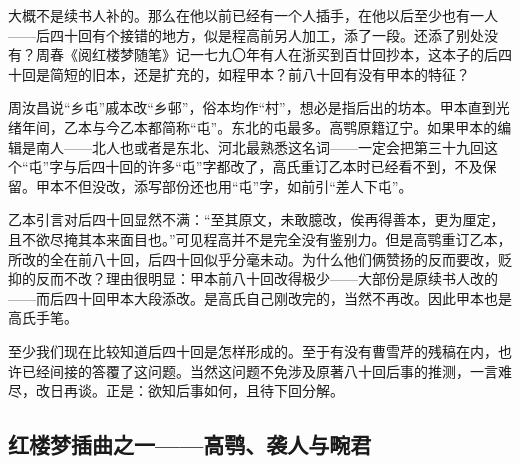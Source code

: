 \par 大概不是续书人补的。那么在他以前已经有一个人插手，在他以后至少也有一人——后四十回有个接错的地方，似是程高前另人加工，添了一段。还添了别处没有？周春《阅红楼梦随笔》记一七九〇年有人在浙买到百廿回抄本，这本子的后四十回是简短的旧本，还是扩充的，如程甲本？前八十回有没有甲本的特征？
\par 周汝昌说“乡屯”戚本改“乡邨”，俗本均作“村”，想必是指后出的坊本。甲本直到光绪年间，乙本与今乙本都简称“屯”。东北的屯最多。高鹗原籍辽宁。如果甲本的编辑是南人——北人也或者是东北、河北最熟悉这名词——一定会把第三十九回这个“屯”字与后四十回的许多“屯”字都改了，高氏重订乙本时已经看不到，不及保留。甲本不但没改，添写部份还也用“屯”字，如前引“差人下屯”。
\par 乙本引言对后四十回显然不满：“至其原文，未敢臆改，俟再得善本，更为厘定，且不欲尽掩其本来面目也。”可见程高并不是完全没有鉴别力。但是高鹗重订乙本，所改的全在前八十回，后四十回似乎分毫未动。为什么他们俩赞扬的反而要改，贬抑的反而不改？理由很明显：甲本前八十回改得极少——大部份是原续书人改的——而后四十回甲本大段添改。是高氏自己刚改完的，当然不再改。因此甲本也是高氏手笔。
\par 至少我们现在比较知道后四十回是怎样形成的。至于有没有曹雪芹的残稿在内，也许已经间接的答覆了这问题。当然这问题不免涉及原著八十回后事的推测，一言难尽，改日再谈。正是：欲知后事如何，且待下回分解。





\subsection{红楼梦插曲之一——高鹗、袭人与畹君}


